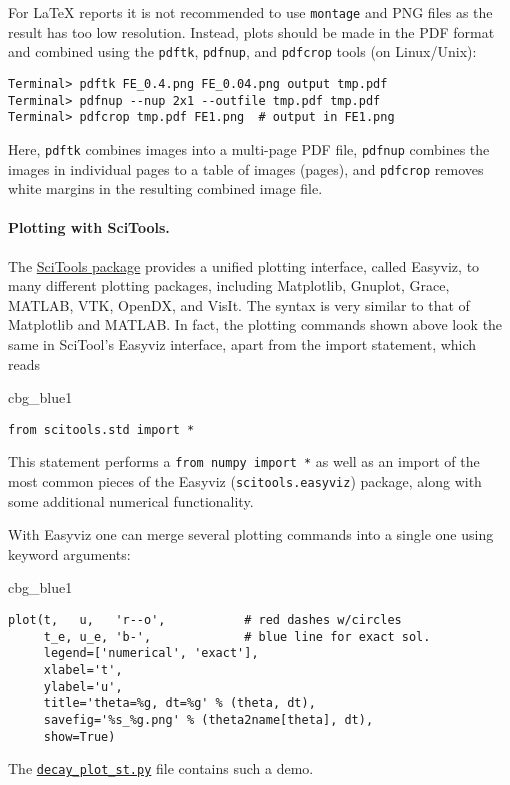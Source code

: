 \documentclass[graybox,sectrefs,envcountresetchap,open=right,final]{svmonodo}
\newenvironment{_cod_tight}[1]{
   \def\FrameCommand{\colorbox{#1}}
   \FrameRule0.6pt\MakeFramed {\FrameRestore}\vskip3mm}
   {\vskip0mm\endMakeFramed}
\newenvironment{cod}[1]{
\bgroup\rmfamily
\fboxsep=0mm\relax
\begin{_cod_tight}{#1}
\list{}{\parsep=-2mm\parskip=0mm\topsep=0pt\leftmargin=2mm
\rightmargin=2\leftmargin\leftmargin=4pt\relax}
\item\relax}
{\endlist\end{_cod_tight}\egroup}
\begin{document}

For {\LaTeX} reports it is not recommended to use \texttt{montage} and PNG files
as the result has too low resolution. Instead, plots should be made
in the PDF format and combined using the \texttt{pdftk}, \texttt{pdfnup}, and \texttt{pdfcrop} tools
(on Linux/Unix):

\begin{Verbatim}[frame=lines,label=\fbox{{\tiny Terminal}},framesep=2.5mm,framerule=0.7pt,fontsize=\fontsize{9pt}{9pt}]
Terminal> pdftk FE_0.4.png FE_0.04.png output tmp.pdf
Terminal> pdfnup --nup 2x1 --outfile tmp.pdf tmp.pdf
Terminal> pdfcrop tmp.pdf FE1.png  # output in FE1.png
\end{Verbatim}
Here, \texttt{pdftk} combines images into a multi-page PDF file, \texttt{pdfnup}
combines the images in individual pages to a table of images (pages),
and \texttt{pdfcrop} removes white margins in the resulting combined image file.


\paragraph{Plotting with SciTools.}
The \href{{https://github.com/hplgit/scitools}}{SciTools package} provides a
unified plotting interface, called Easyviz, to many different plotting
packages, including Matplotlib, Gnuplot, Grace, MATLAB,
VTK, OpenDX, and VisIt. The syntax is very similar to that of
Matplotlib and MATLAB. In fact, the plotting commands shown above look
the same in SciTool's Easyviz interface, apart from the import
statement, which reads

\begin{cod}{cbg_blue1}\begin{Verbatim}[numbers=none,fontsize=\fontsize{9pt}{9pt},baselinestretch=0.95,xleftmargin=2mm]
from scitools.std import *
\end{Verbatim}
\end{cod}
\noindent
This statement performs a \texttt{from numpy import *} as well as an import
of the most common pieces of the Easyviz (\texttt{scitools.easyviz}) package,
along with some additional numerical functionality.

With Easyviz one can
merge several plotting commands into a single one
using keyword arguments:

\begin{cod}{cbg_blue1}\begin{Verbatim}[numbers=none,fontsize=\fontsize{9pt}{9pt},baselinestretch=0.95,xleftmargin=2mm]
plot(t,   u,   'r--o',           # red dashes w/circles
     t_e, u_e, 'b-',             # blue line for exact sol.
     legend=['numerical', 'exact'],
     xlabel='t',
     ylabel='u',
     title='theta=%g, dt=%g' % (theta, dt),
     savefig='%s_%g.png' % (theta2name[theta], dt),
     show=True)
\end{Verbatim}
\end{cod}
\noindent
The \href{{http://tinyurl.com/ofkw6kc/alg/decay_plot_st.py}}{\nolinkurl{decay_plot_st.py}} file
contains such a demo.
\end{document}
